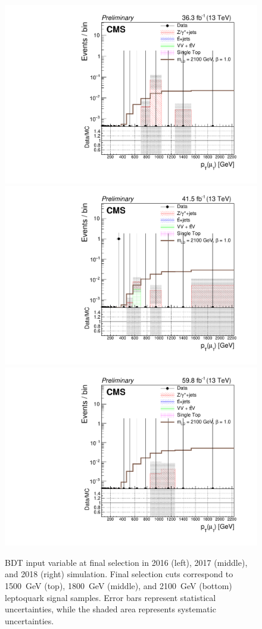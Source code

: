 \begin{figure}[H]
    {\includegraphics[width=.32\textwidth]{Images/Analysis/Results_2016_Unblinded/Plots/Final_selection/BasicLQ_uujj_Pt_muon1_final2100.pdf}}
    {\includegraphics[width=.32\textwidth]{Images/Analysis/Results_2017_Unblinded/Plots/Final_selection/BasicLQ_uujj_Pt_muon1_final2100.pdf}}
    {\includegraphics[width=.32\textwidth]{Images/Analysis/Results_2018_Unblinded/Plots/Final_selection/BasicLQ_uujj_Pt_muon1_final2100.pdf}}
    \caption{BDT input variable \ptof{\PmuOne} at final selection in 2016 (left), 2017 (middle), and 2018 (right) simulation. Final selection cuts correspond to \SI{1500}{GeV} (top), \SI{1800}{GeV} (middle), and \SI{2100}{GeV} (bottom) leptoquark signal samples. Error bars represent statistical uncertainties, while the shaded area represents systematic uncertainties.
    \label{figapp:finalSelptu1}}
\end{figure}
